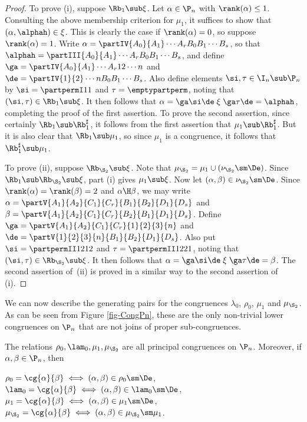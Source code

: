 \begin{proof} To prove (i), suppose $\Rb_1\sub\xi$.  Let $\alpha\in\P_n$ with $\rank(\alpha)\leq1$.  
Consulting the above membership criterion for $\mu_1$, it suffices to show that
$(\alpha,\alphah)\in\xi$.  This is clearly the case if $\rank(\alpha)=0$, so suppose $\rank(\alpha)=1$.  Write $\alpha=\partIV{A_0}{A_1}\cdots{A_r}{B_0}{B_1}\cdots{B_s}$, so that $\alphah=\partIII{A_0}{A_1}\cdots{A_r}{B_0}{B_1}\cdots{B_s}$, and define $\ga=\partIV{A_0}{A_1}\cdots{A_r}{1}{2}\cdots{n}$ and $\de=\partIV{1}{2}\cdots{n}{B_0}{B_1}\cdots{B_s}$.
Also define elements $\si,\tau\in\I_n\sub\P_n$ by $\si=\partpermI11$ and $\tau=\emptypartperm$, noting that $(\si,\tau)\in\Rb_1\sub\xi$.  It then follows that $\alpha=\ga\si\de \mathrel\xi \ga\tau\de = \alphah$, completing the proof of the first assertion.  To prove the second assertion, since certainly $\Rb_1\sub\Rb_1^\sharp$, it follows from the first assertion that $\mu_1\sub\Rb_1^\sharp$.  But it is also clear that $\Rb_1\sub\mu_1$, so since $\mu_1$ is a congruence, it follows that $\Rb_1^\sharp\sub\mu_1$.


To prove (ii), suppose $\Rb_{\S_2}\sub\xi$. Note that $\mu_{\S_2}=\mu_1\cup(\nu_{\S_2}\sm\De)$.
 Since $\Rb_1\sub\Rb_{\S_2}\sub\xi$, part (i) gives $\mu_1\sub\xi$.  
Now let $(\alpha,\beta)\in\nu_{\S_2}\sm\De$.  Since $\rank(\alpha)=\rank(\beta)=2$ and $\alpha\H\beta$, we may write $\alpha=\partV{A_1}{A_2}{C_1}{C_r}{B_1}{B_2}{D_1}{D_s}$ and $\beta=\partV{A_1}{A_2}{C_1}{C_r}{B_2}{B_1}{D_1}{D_s}$.  Define $\ga=\partV{A_1}{A_2}{C_1}{C_r}{1}{2}{3}{n}$ and $\de=\partV{1}{2}{3}{n}{B_1}{B_2}{D_1}{D_s}$.
Also put $\si=\partpermII1212$ and $\tau=\partpermII1221$, noting that $(\si,\tau)\in\Rb_{\S_2}\sub\xi$.  It then follows that $\alpha=\ga\si\de \mathrel\xi \ga\tau\de = \beta$.  The second assertion of~(ii) is proved in a similar way to the second assertion of (i).  \end{proof}

We can now describe the generating pairs for the congruences $\lambda_0$, $\rho_0$, $\mu_1$ and $\mu_{\S_2}$.  As can be seen from Figure \ref{fig-CongPn}, these are the only non-trivial lower congruences on $\P_n$ that are not joins of proper sub-congruences.



\begin{proposition}\label{prop:small_congruences}
The relations $\rho_0,\lam_0,\mu_1,\mu_{\S_2}$ are all principal congruences on $\P_n$.  Moreover, if $\alpha,\beta\in\P_n$, then
\begin{itemize}\begin{multicols}{2}
 $\rho_0=\cg{\alpha}{\beta}\iff (\alpha,\beta)\in\rho_0\sm\De$,
 $\lam_0=\cg{\alpha}{\beta}\iff (\alpha,\beta)\in\lam_0\sm\De$,
 $\mu_1=\cg{\alpha}{\beta}\iff (\alpha,\beta)\in\mu_1\sm\De$, 
 $\mu_{\S_2}=\cg{\alpha}{\beta}\iff (\alpha,\beta)\in\mu_{\S_2}\sm\mu_1$.
\end{multicols}\end{itemize}
\end{proposition}

